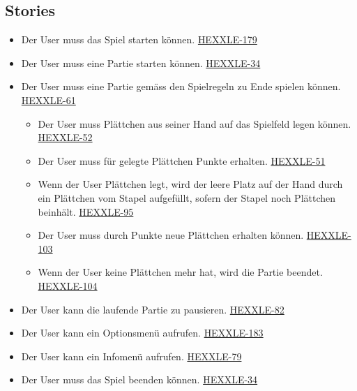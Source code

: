 \documentclass[../main.tex]{subfiles}
\begin{document}
    \subsection{Stories}
    \label{section:Stories}
    \begin{itemize}
    	\item Der User muss das Spiel starten können. \href{https://hexxle.atlassian.net/browse/HEXXLE-179}{HEXXLE-179}
    	\item Der User muss eine Partie starten können. \href{https://hexxle.atlassian.net/browse/HEXXLE-34}{HEXXLE-34}
    	\item Der User muss eine Partie gemäss den Spielregeln zu Ende spielen können. \href{https://hexxle.atlassian.net/browse/HEXXLE-61}{HEXXLE-61}
    	\begin{itemize}
    		\item Der User muss Plättchen aus seiner Hand auf das Spielfeld legen können. \href{https://hexxle.atlassian.net/browse/HEXXLE-52}{HEXXLE-52}
    		\item Der User muss für gelegte Plättchen Punkte erhalten. \href{https://hexxle.atlassian.net/browse/HEXXLE-51}{HEXXLE-51}
    		\item Wenn der User Plättchen legt, wird der leere Platz auf der Hand durch ein Plättchen vom Stapel aufgefüllt, sofern der Stapel noch Plättchen beinhält.
    		\href{https://hexxle.atlassian.net/browse/HEXXLE-95}{HEXXLE-95}
    		\item Der User muss durch Punkte neue Plättchen erhalten können. \href{https://hexxle.atlassian.net/browse/HEXXLE-103}{HEXXLE-103}
    		\item Wenn der User keine Plättchen mehr hat, wird die Partie beendet. \href{https://hexxle.atlassian.net/browse/HEXXLE-104}{HEXXLE-104}
    	\end{itemize}
    	\item Der User kann die laufende Partie zu pausieren. \href{https://hexxle.atlassian.net/browse/HEXXLE-82}{HEXXLE-82}
    	\item Der User kann ein Optionsmenü aufrufen. \href{https://hexxle.atlassian.net/browse/HEXXLE-183}{HEXXLE-183}
    	\item Der User kann ein Infomenü aufrufen. \href{https://hexxle.atlassian.net/browse/HEXXLE-79}{HEXXLE-79}
    	\item Der User muss das Spiel beenden können. \href{https://hexxle.atlassian.net/browse/HEXXLE-34}{HEXXLE-34}
    \end{itemize}
\end{document}

